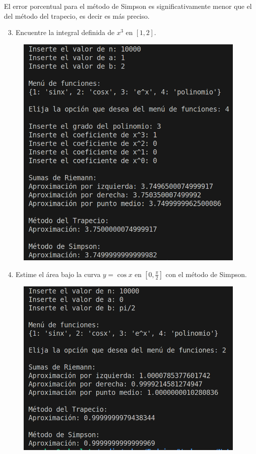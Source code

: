 El error porcentual para el método de Simpson es significativamente menor que el del método del trapecio, es decir es más preciso.


\begin{enumerate}
    \setcounter{enumi}{2}
    \item Encuentre la integral definida de \( x^3 \) en \([1,2]\).
\end{enumerate}

\begin{figure}[H]
    \centering
    \includegraphics[scale=0.25]{images/python3.png}
    \label{fig:integralCubica}
\end{figure}

\begin{enumerate}
    \setcounter{enumi}{3}
    \item Estime el área bajo la curva \( y = \cos x \) en \([0, \frac{\pi}{2}]\) con el método de Simpson.
\end{enumerate}

\begin{figure}[H]
    \centering
    \includegraphics[scale=0.25]{images/python4.png}
    \label{fig:integralCoseno}
\end{figure}